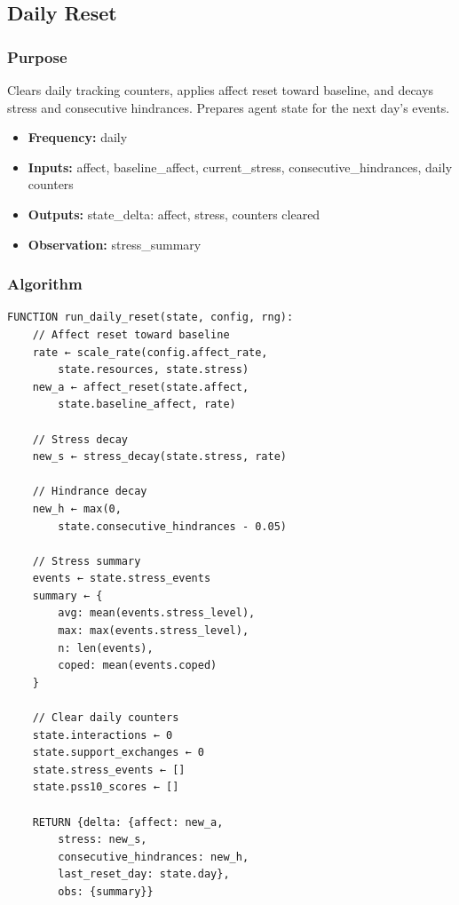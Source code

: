 \documentclass[
  letterpaper,
  DIV=11,
  numbers=noendperiod]{scrartcl}
\providecommand{\tightlist}{%
  \setlength{\itemsep}{0pt}\setlength{\parskip}{0pt}}
\begin{document}
\subsection{Daily Reset}\label{daily-reset}

\subsubsection{Purpose}\label{purpose-10}

Clears daily tracking counters, applies affect reset toward baseline,
and decays stress and consecutive hindrances. Prepares agent state for
the next day's events.

\begin{itemize}
\tightlist
\item
  \textbf{Frequency:} daily
\item
  \textbf{Inputs:} affect, baseline\_affect, current\_stress,
  consecutive\_hindrances, daily counters
\item
  \textbf{Outputs:} state\_delta: affect, stress, counters cleared
\item
  \textbf{Observation:} stress\_summary
\end{itemize}

\subsubsection{Algorithm}\label{algorithm-8}

\begin{verbatim}
FUNCTION run_daily_reset(state, config, rng):
    // Affect reset toward baseline
    rate ← scale_rate(config.affect_rate,
        state.resources, state.stress)
    new_a ← affect_reset(state.affect,
        state.baseline_affect, rate)

    // Stress decay
    new_s ← stress_decay(state.stress, rate)

    // Hindrance decay
    new_h ← max(0,
        state.consecutive_hindrances - 0.05)

    // Stress summary
    events ← state.stress_events
    summary ← {
        avg: mean(events.stress_level),
        max: max(events.stress_level),
        n: len(events),
        coped: mean(events.coped)
    }

    // Clear daily counters
    state.interactions ← 0
    state.support_exchanges ← 0
    state.stress_events ← []
    state.pss10_scores ← []

    RETURN {delta: {affect: new_a,
        stress: new_s,
        consecutive_hindrances: new_h,
        last_reset_day: state.day},
        obs: {summary}}
\end{verbatim}
\end{document}
